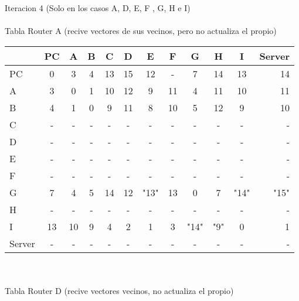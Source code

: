 \documentclass{article}
\begin{document}
\\
\\
Iteracion 4 (Solo en los casos A, D, E, F , G, H e I)
\\
\\
Tabla Router A (recive vectores de sus vecinos, pero no actualiza el propio) \\
\begin{tabular}{l*{10}{c}r}
              & PC & A & B & C & D & E & F & G & H & I & Server \\
\hline
PC             & 0 & 3 & 4 & 13& 15& 12& - & 7 & 14 & 13 & 14\\
A              & 3 & 0 & 1 & 10 & 12 & 9 & 11 & 4 & 11 & 10 & 11 \\
B              & 4 & 1 & 0 & 9 & 11	& 8 & 10 & 5 & 12 & 9 & 10\\
C              & - & - & - & - & - & - & - & - & - & - & -\\
D              & - & - & - & - & - & - & - & - & - & - & -\\
E              & - & - & - & - & - & - & - & - & - & - & -\\
F              & - & - & - & - & - & - & - & - & - & - & -\\
G              & 7 & 4 & 5 & 14 & 12 & "13" & 13 & 0 & 7 & "14" & "15"\\
H              & - & - & - & - & - & - & - & - & - & - & -\\
I              & 13 & 10 & 9 & 4 & 2 & 1 & 3 & "14" & "9" & 0 & 1\\
Server         & - & - & - & - & - & - & - & - & - & - & -\\

\end{tabular}
\\
\\
Tabla Router D (recive vectores vecinos, no actualiza el propio)	 \\
\end{document}
